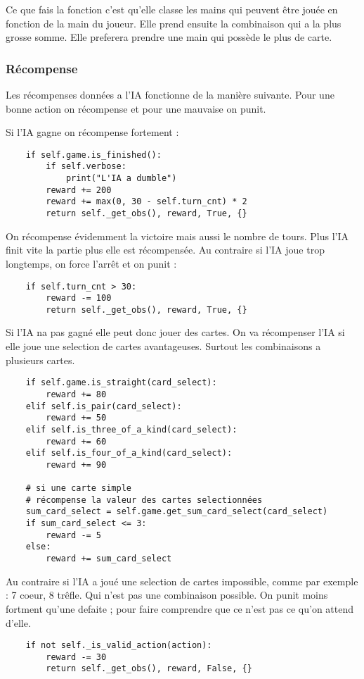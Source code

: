 \documentclass[a4paper,12pt]{article}
\begin{document}
Ce que fais la fonction c'est qu'elle classe les mains qui peuvent être jouée en fonction de la main du joueur. Elle prend ensuite la combinaison qui a la plus grosse somme. Elle preferera prendre une main qui possède le plus de carte.

\subsubsection{Récompense}
\label{rewards}

Les récompenses données a l'IA fonctionne de la manière suivante. Pour une bonne action on récompense et pour une mauvaise on punit.

Si l'IA gagne on récompense fortement : 
\begin{verbatim}
    if self.game.is_finished():
        if self.verbose:
            print("L'IA a dumble")
        reward += 200
        reward += max(0, 30 - self.turn_cnt) * 2
        return self._get_obs(), reward, True, {}
\end{verbatim}
On récompense évidemment la victoire mais aussi le nombre de tours. Plus l'IA finit vite la partie plus elle est récompensée. Au contraire si l'IA joue trop longtemps, on force l'arrêt et on punit :
\begin{verbatim}
    if self.turn_cnt > 30:
        reward -= 100
        return self._get_obs(), reward, True, {}
\end{verbatim}
Si l'IA na pas gagné elle peut donc jouer des cartes. On va récompenser l'IA si elle joue une selection de cartes avantageuses. Surtout les combinaisons a plusieurs cartes.
\begin{verbatim}
    if self.game.is_straight(card_select):
        reward += 80
    elif self.is_pair(card_select):
        reward += 50
    elif self.is_three_of_a_kind(card_select):
        reward += 60
    elif self.is_four_of_a_kind(card_select):
        reward += 90  
    
    # si une carte simple
    # récompense la valeur des cartes selectionnées
    sum_card_select = self.game.get_sum_card_select(card_select)
    if sum_card_select <= 3:
        reward -= 5
    else:
        reward += sum_card_select
\end{verbatim}
Au contraire si l'IA a joué une selection de cartes impossible, comme par exemple : 7 coeur, 8 trêfle. Qui n'est pas une combinaison possible. On punit moins fortment qu'une defaite ; pour faire comprendre que ce n'est pas ce qu'on attend d'elle.
\begin{verbatim}
    if not self._is_valid_action(action):
        reward -= 30
        return self._get_obs(), reward, False, {}
\end{verbatim}
\end{document}
